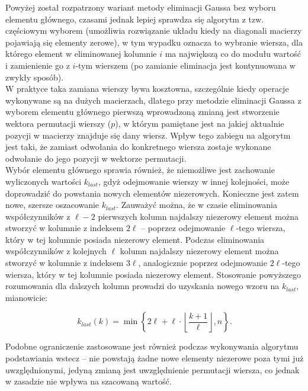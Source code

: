 \documentclass{mk-polish-lab-report}
\begin{document}
\noindent Powyżej został rozpatrzony wariant metody eliminacji Gaussa bez wyboru elementu głównego, czasami jednak lepiej sprawdza się algorytm z tzw. częściowym wyborem (umożliwia rozwiązanie układu kiedy na diagonali macierzy pojawiają się elementy zerowe), w tym wypadku oznacza to wybranie wiersza, dla którego element w eliminowanej kolumnie $i$ ma największą co do modułu wartość i zamienienie go z $i$-tym wierszem (po zamianie eliminacja jest kontynuowana w zwykły sposób). \\

\noindent W praktyce taka zamiana wierszy bywa kosztowna, szczególnie kiedy operacje wykonywane są na dużych macierzach, dlatego przy metodzie eliminacji Gaussa z wyborem elementu głównego pierwszą wprowadzoną zmianą jest stworzenie wektora permutacji wierszy ($p$), w którym pamiętane jest na jakiej aktualnie pozycji w macierzy znajduje się dany wiersz. Wpływ tego zabiegu na algorytm jest taki, że zamiast odwołania do konkretnego wiersza zostaje wykonane odwołanie do jego pozycji w wektorze permutacji. \\

\noindent Wybór elementu głównego sprawia również, że niemożliwe jest zachowanie wyliczonych wartości $k_{last}$, gdyż odejmowanie wierszy w innej kolejności, może doprowadzić do powstania nowych elementów niezerowych. Konieczne jest zatem nowe, szersze oszacowanie $k_{last}$. Zauważyć można, że w czasie eliminowania współczynników z $\ell - 2$ pierwszych kolumn najdalszy niezerowy element można stworzyć w kolumnie z indeksem $2\ell$ -- poprzez odejmowanie $\ell$-tego wiersza, który w tej kolumnie posiada niezerowy element. Podczas eliminowania współczynników z kolejnych $\ell$ kolumn  najdalszy niezerowy element można stworzyć w kolumnie z indeksem $3\ell$, analogicznie poprzez odejmowanie $2\ell$-tego wiersza, który w tej kolumnie posiada niezerowy element. Stosowanie powyższego rozumowania dla dalszych kolumn prowadzi do uzyskania nowego wzoru na $k_{last}$, mianowicie:  

\begin{equation}
k_{last}(k) = \min\left\lbrace2\ell + \ell \cdot \left \lfloor\frac{k + 1}{\ell}\right \rfloor, n\right\rbrace.
\label{eq:max_col_piv}
\end{equation}

\noindent Podobne ograniczenie zastosowane jest również podczas wykonywania algorytmu podstawiania wstecz -- nie powstają żadne nowe elementy niezerowe poza tymi już uwzględnionymi, jedyną zmianą jest uwzględnienie permutacji wiersza, co jednak w zasadzie nie wpływa na szacowaną wartość. \\
\end{document}
